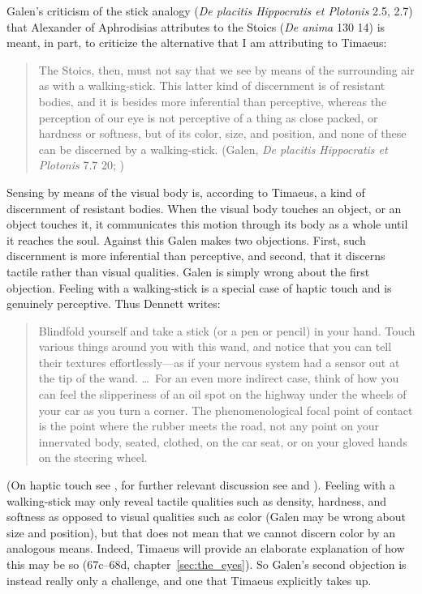 Galen's criticism of the stick analogy (\emph{De placitis Hippocratis et Plotonis} 2.5, 2.7) that Alexander of Aphrodisias attributes to the Stoics (\emph{De anima} 130 14) is meant, in part, to criticize the alternative that I am attributing to Timaeus:
\begin{quote}
	The Stoics, then, must not say that we see by means of the surrounding air as with a walking-stick. This latter kind of discernment is of resistant bodies, and it is besides more inferential than perceptive, whereas the perception of our eye is not perceptive of a thing as close packed, or hardness or softness, but of its color, size, and position, and none of these can be discerned by a walking-stick. (Galen, \emph{De placitis Hippocratis et Plotonis} 7.7 20; \citealt[475]{Lacy:1980mk})
\end{quote}
Sensing by means of the visual body is, according to Timaeus, a kind of discernment of resistant bodies. When the visual body touches an object, or an object touches it, it communicates this motion through its body as a whole until it reaches the soul. Against this Galen makes two objections. First, such discernment is more inferential than perceptive, and second, that it discerns tactile rather than visual qualities. Galen is simply wrong about the first objection. Feeling with a walking-stick is a special case of haptic touch and is genuinely perceptive. Thus Dennett writes:
\begin{quote}
	Blindfold yourself and take a stick (or a pen or pencil) in your hand. Touch various things around you with this wand, and notice that you can tell their textures effortlessly---as if your nervous system had a sensor out at the tip of the wand. \ldots\ For an even more indirect case, think of how you can feel the slipperiness of an oil spot on the highway under the wheels of your car as you turn a corner. The phenomenological focal point of contact is the point where the rubber meets the road, not any point on your innervated body, seated, clothed, on the car seat, or on your gloved hands on the steering wheel. \citep[47]{Dennett:1993ce}
\end{quote}
(On haptic touch see \citealt{Lederman:1987fr}, for further relevant discussion see \citealt{Fulkerson:2014ek} and \citealt[chapters 1--2]{Kalderon:2018oe}). Feeling with a walking-stick may only reveal tactile qualities such as density, hardness, and softness as opposed to visual qualities such as color (Galen may be wrong about size and position), but that does not mean that we cannot discern color by an analogous means. Indeed, Timaeus will provide an elaborate explanation of how this may be so (67c–68d, chapter~\ref{sec:the_eyes}). So Galen's second objection is instead really only a challenge, and one that Timaeus explicitly takes up.

